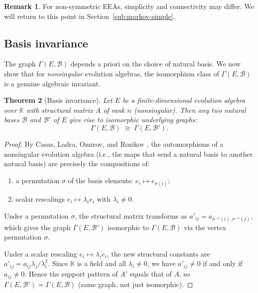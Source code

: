 \documentclass[12pt,a4paper]{amsart}
\newtheorem{theorem}{Theorem}[section]
\theoremstyle{definition}
\newtheorem{remark}[theorem]{Remark}
\newcommand{\K}{\mathbb{K}}
\newcommand{\EA}{E}          %
\newcommand{\natbasis}{\mathcal{B}}  %
\newcommand{\strmat}{A}      %
\begin{document}
\begin{remark}
For non-symmetric EEAs, simplicity and connectivity may differ.  We
will return to this point in Section~\ref{sub:markov-simple}.
\end{remark}

\subsection{Basis invariance}\label{sub:basis-inv}

The graph $\varGamma(\EA,\natbasis)$ depends a priori on the choice of
natural basis.  We now show that for \emph{nonsingular} evolution
algebras, the isomorphism class of $\varGamma(\EA,\natbasis)$ is a
genuine algebraic invariant.

\begin{theorem}[Basis invariance]\label{thm:basis-invariance}
Let $\EA$ be a finite-dimensional evolution algebra over $\K$ with
structural matrix $\strmat$ of rank $n$ (nonsingular).  Then any two
natural bases $\natbasis$ and $\natbasis'$ of $\EA$ give rise to
isomorphic underlying graphs:
\[
  \varGamma(\EA,\natbasis) \;\cong\; \varGamma(\EA,\natbasis').
\]
\end{theorem}

\begin{proof}
By Casas, Ladra, Omirov, and Rozikov \cite{CasasLadraOmirovRozikov2010},
the automorphisms of a nonsingular evolution algebra (i.e., the maps
that send a natural basis to another natural basis) are precisely the
compositions of:
\begin{enumerate}[label=\normalfont(\roman*)]
  \item a permutation $\sigma$ of the basis elements: $e_i\mapsto e_{\sigma(i)}$;
  \item scalar rescalings $e_i\mapsto\lambda_i e_i$ with
        $\lambda_i\ne 0$.
\end{enumerate}
Under a permutation $\sigma$, the structural matrix transforms as
$a'_{ij}=a_{\sigma^{-1}(i),\sigma^{-1}(j)}$, which gives the graph
$\varGamma(\EA,\natbasis')$ isomorphic to $\varGamma(\EA,\natbasis)$
via the vertex permutation $\sigma$.

Under a scalar rescaling $e_i\mapsto\lambda_i e_i$, the new structural
constants are $a'_{ij}=a_{ij}\lambda_j/\lambda_i^2$.  Since $\K$ is a
field and all $\lambda_i\ne 0$, we have $a'_{ij}\ne 0$ if and only if
$a_{ij}\ne 0$.  Hence the support pattern of $\strmat'$ equals that of
$\strmat$, so $\varGamma(\EA,\natbasis')=\varGamma(\EA,\natbasis)$
(same graph, not just isomorphic).
\end{proof}
\end{document}
